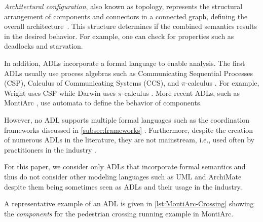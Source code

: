 \documentclass[runningheads]{llncs}
\begin{document}
\textit{Architectural configuration}, also known as topology, represents the structural arrangement of components and connectors in a connected graph, defining the overall architecture~\cite{medvidovicClassificationComparisonFramework2000}.
This structure determines if the combined semantics results in the desired behavior.
For example, one can check for properties such as deadlocks and starvation.

In addition, ADLs incorporate a formal language to enable analysis.
The first ADLs usually use process algebras such as Communicating Sequential Processes (CSP), Calculus of Communicating Systems (CCS), and $\pi$-calculus \cite{ozkayaAreWeThere2013}.
For example, Wright uses CSP \cite{allenFormalBasisArchitectural1997} while Darwin uses $\pi$-calculus \cite{mageeSpecifyingDistributedSoftware1995}.
More recent ADLs, such as MontiArc \cite{haberMontiArcArchitecturalModeling2014}, use automata to define the behavior of components.

However, no ADL supports multiple formal languages such as the coordination frameworks discussed in \autoref{subsec:frameworks} \cite{medvidovicClassificationComparisonFramework2000}.
Furthermore, despite the creation of numerous ADLs in the literature, they are not mainstream, i.e., used often by practitioners in the industry \cite{clementsSurveyArchitectureDescription1996,woodsArchitectureDescriptionLanguages2005,pandeyArchitecturalDescriptionLanguages2010,ozkayaAreWeThere2013,medvidovicMovingArchitecturalDescription2006}.

For this paper, we consider only ADLs that incorporate formal semantics and thus do not consider other modeling languages such as UML \cite{objectmanagementgroupUnifiedModelingLanguage2017} and ArchiMate \cite{theopengroupArchiMateSpecification2023} despite them being sometimes seen as ADLs and their usage in the industry.

A representative example of an ADL is given in  \autoref{lst:MontiArc-Crossing} showing the \textit{components} for the pedestrian crossing running example in MontiArc.


\end{document}
